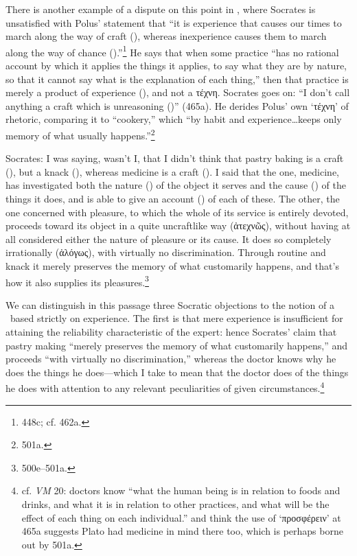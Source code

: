 \documentclass[11pt,letterpaper,oneside]{amsart} %
\begin{document}





There is another example of a dispute on this point in , where Socrates is unsatisfied with Polus' statement that ``it is experience that causes our times to march along the way of craft (\techne), whereas inexperience causes them to march along the way of chance (\tuche).''\footnote{448c; cf. 462a.} He says that when some practice ``has no rational account by which it applies the things it applies, to say what they are by nature, so that it cannot say what is the explanation of each thing,'' then that practice is merely a product of experience (\empeiria), and not a τέχνη. Socrates goes on: ``I don't call anything a craft which is unreasoning (\alogos)'' (465a). He derides Polus' own `τέχνη' of rhetoric, comparing it to ``cookery,'' which ``by habit and experience\ldots keeps only memory of what usually happens.''\footnote{501a.} \begin{squote}Socrates: I was saying, wasn't I, that I didn't think that pastry baking is a craft (\techne), but a knack (\empeiria), whereas medicine is a craft (\techne). I said that the one, medicine, has investigated both the nature (\phusis) of the object it serves and the cause (\aitia) of the things it does, and is able to give an account (\logos) of each of these. The other, the one concerned with pleasure, to which the whole of its service is entirely devoted, proceeds toward its object in a quite uncraftlike way (ἀτεχνῶς), without having at all considered either the nature of pleasure or its cause. It does so completely irrationally (ἀλόγως), with virtually no discrimination. Through routine and knack it merely preserves the memory of what customarily happens, and that's how it also supplies its pleasures.\footnote{500e--501a.}\end{squote}



We can distinguish in this passage three Socratic objections to the notion of a \techne\ based strictly on experience. The first is that mere experience is insufficient for attaining the reliability characteristic of the expert: hence Socrates' claim that pastry making ``merely preserves the memory of what customarily happens,'' and proceeds ``with virtually no discrimination,'' whereas the doctor knows why he does the things he does---which I take to mean that the doctor does  of the things he does with attention to any relevant peculiarities of given circumstances.\footnote{cf. \emph{VM} 20: doctors know ``what the human being is in relation to foods and drinks, and what it is in relation to other practices, and what will be the effect of each thing on each individual.'' \citet{dodds1959pg} and \citet{irwin1979pg} think the use of `προσφέρειν' at 465a suggests Plato had medicine in mind there too, which is perhaps borne out by 501a.}
\end{document}

